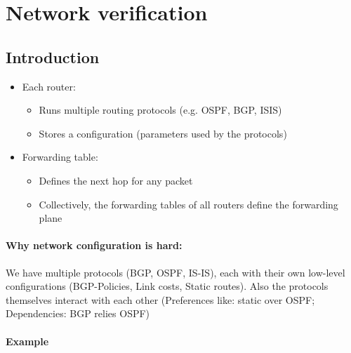 \section{Network verification}
\subsection{Introduction}
\begin{itemize}
    \item Each router:\begin{itemize}
        \item Runs multiple routing protocols (e.g. OSPF, BGP, ISIS)
        \item Stores a configuration (parameters used by the protocols)
    \end{itemize}
    \item Forwarding table:\begin{itemize}
        \item Defines the next hop for any packet
        \item Collectively, the forwarding tables of all routers define the forwarding plane
    \end{itemize}
\end{itemize}
\begin{minipage}{\linewidth}
    \centering      
    \def\svgwidth{\linewidth}
        
\end{minipage}
\paragraph{Why network configuration is hard:\newline}
We have multiple protocols (BGP, OSPF, IS-IS), each with their own low-level configurations (BGP-Policies, Link costs, Static routes). Also the protocols themselves interact with each other (Preferences like: static over OSPF; Dependencies: BGP relies OSPF)\newline
\paragraph{Example\newline}
\begin{minipage}{\linewidth}
    \centering      
    \def\svgwidth{\linewidth}
        
\end{minipage}
\begin{minipage}{\linewidth}
    \centering      
    \def\svgwidth{\linewidth}
        
\end{minipage}
